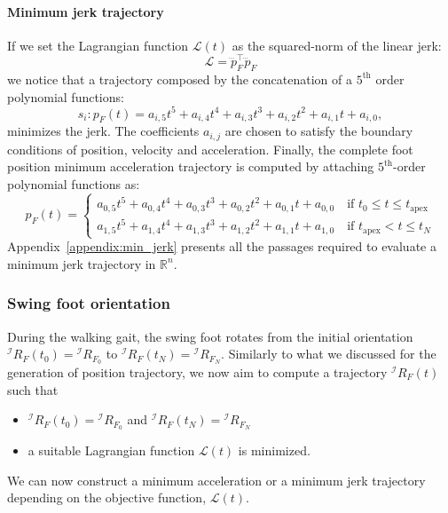 \paragraph{Minimum jerk trajectory}
If we set the Lagrangian function $\mathcal{L}(t)$ as the squared-norm of the linear jerk:
\begin{equation}
    \mathcal{L} = \dddot{p}_F^\top \dddot{p}_F
\end{equation}
we notice that a trajectory composed by the concatenation of a $5^\text{th}$ order polynomial functions:
\begin{equation}
\label{eq:spline_5d_order}
    s_i :  p_F (t) =  a _ {i,5} t ^ 5 + a _ {i,4} t ^ 4 + a _ {i,3} t ^ 3 + a _ {i,2} t ^ 2 + a _ {i,1} t + a _ {i,0},
\end{equation}
minimizes the jerk. The coefficients $a_{i,j}$ are chosen to satisfy the boundary conditions of position, velocity and acceleration.
Finally, the complete foot position minimum acceleration trajectory is computed by attaching $5^\text{th}$-order polynomial functions as:
\begin{equation}
    p_F (t) = \begin{cases} 
      a _ {0,5} t ^ 5 + a _ {0,4} t ^ 4  + a _{0, 3} t ^ 3 + a _ {0,2} t ^ 2 + a _ {0,1} t + a _ {0,0} \quad  \text{if } t_0 \le t \le t_\text{apex} \\
      a _ {1,5} t ^ 5 + a _ {1,4} t ^ 4  + a _{1, 3} t ^ 3 + a _ {1,2} t ^ 2 + a _ {1,1} t + a _ {1,0} \quad  \text{if }  t_\text{apex} < t \le t_N
    \end{cases}
\end{equation}
Appendix~\ref{appendix:min_jerk} presents all the passages required to evaluate a minimum jerk trajectory in $\mathbb{R}^n$.
\subsubsection{Swing foot orientation}
During the walking gait, the swing foot rotates from the initial orientation ${}^\mathcal{I}R_F(t_0) = {}^\mathcal{I}R_{F_0}$ to ${}^\mathcal{I}R_F(t_N) = {}^\mathcal{I}R_{F_N}$. Similarly to what we discussed for the generation of position trajectory, we now aim to compute a trajectory ${}^\mathcal{I}R_F(t)$ such that 
\begin{itemize}
    \item  ${}^\mathcal{I}R_F(t_0) = {}^\mathcal{I}R_{F_0}$ and ${}^\mathcal{I}R_F(t_N) = {}^\mathcal{I}R_{F_N}$
    \item a suitable Lagrangian function $\mathcal{L}(t)$ is minimized.
\end{itemize}
We can now construct a minimum acceleration or a minimum jerk trajectory depending on the objective function, $\mathcal{L}(t)$.
